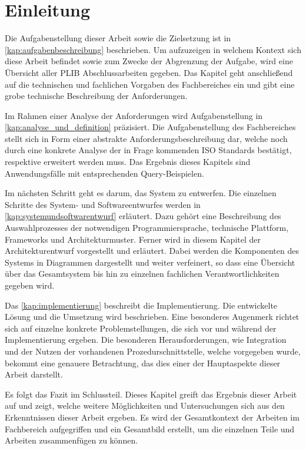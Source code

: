 
\chapter{Einleitung}\label{sec:einleitung}

Die Aufgabenstellung dieser Arbeit sowie die Zielsetzung ist in \autoref{kap:aufgabenbeschreibung} beschrieben. Um aufzuzeigen in welchem Kontext sich diese Arbeit befindet sowie zum Zwecke der Abgrenzung der Aufgabe, wird eine Übersicht aller PLIB Abschlussarbeiten gegeben. Das Kapitel geht anschließend auf die technischen und fachlichen Vorgaben des Fachbereiches ein und gibt eine grobe technische Beschreibung der Anforderungen.

Im Rahmen einer Analyse der Anforderungen wird Aufgabenstellung in \autoref{kap:analyse_und_definition} präzisiert. Die Aufgabenstellung des Fachbereiches stellt sich in Form einer abstrakte Anforderungsbeschreibung dar, welche noch durch eine konkrete Analyse der in Frage kommenden ISO Standards bestätigt, respektive erweitert werden muss. Das Ergebnis dieses Kapitels sind Anwendungsfälle mit entsprechenden Query-Beispielen. 

Im nächsten Schritt geht es darum, das System zu entwerfen. Die einzelnen Schritte des System- und Softwareentwurfes werden in \autoref{kap:systemundsoftwarentwurf} erläutert. Dazu gehört eine Beschreibung des Auswahlprozesses der notwendigen Programmiersprache, technische Plattform, Frameworks und Architekturmuster. 
Ferner wird in diesem Kapitel der Architekturentwurf vorgestellt und erläutert. Dabei werden die Komponenten des Systems in Diagrammen dargestellt und weiter verfeinert, so dass eine Übersicht über das Gesamtsystem bis hin zu einzelnen fachlichen Verantwortlichkeiten gegeben wird. 

Das \autoref{kap:implementierung} beschreibt die Implementierung. Die entwickelte Lösung und die Umsetzung wird beschrieben. Eine besonderes Augenmerk richtet sich auf einzelne konkrete Problemstellungen, die sich vor und während der Implementierung ergeben. Die besonderen Herausforderungen, wie Integration und der Nutzen der vorhandenen Prozedurschnittstelle, welche vorgegeben wurde, bekommt eine genauere Betrachtung, das dies einer der Hauptaspekte dieser Arbeit darstellt.

Es folgt das Fazit im Schlussteil. Dieses Kapitel greift das Ergebnis dieser Arbeit auf und zeigt, welche weitere Möglichkeiten und Untersuchungen sich aus den Erkenntnissen dieser Arbeit ergeben. Es wird der Gesamtkontext der Arbeiten im Fachbereich aufgegriffen und ein Gesamtbild erstellt, um die einzelnen Teile und Arbeiten zusammenfügen zu können. 